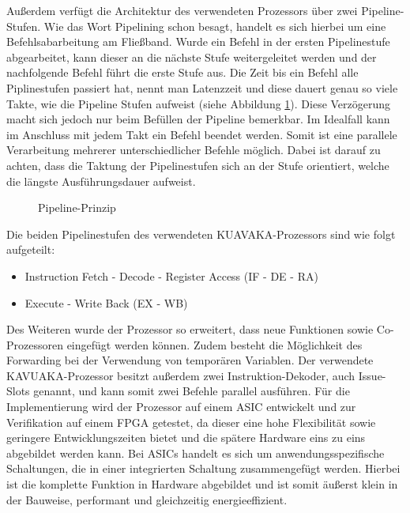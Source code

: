 Außerdem verfügt die Architektur des verwendeten Prozessors über zwei Pipeline-Stufen.
Wie das Wort Pipelining schon besagt, handelt es sich hierbei um eine Befehlsabarbeitung am Fließband. Wurde ein Befehl in der ersten Pipelinestufe abgearbeitet, kann dieser an die nächste Stufe weitergeleitet werden und der nachfolgende Befehl führt die erste Stufe aus. Die Zeit bis ein Befehl alle Piplinestufen passiert hat, nennt man Latenzzeit und diese dauert genau so viele Takte, wie die Pipeline Stufen aufweist (siehe Abbildung \ref{fig:pipeline}). Diese Verzögerung macht sich jedoch nur beim Befüllen der Pipeline bemerkbar. Im Idealfall kann im Anschluss mit jedem Takt ein Befehl beendet werden. Somit ist eine parallele Verarbeitung mehrerer unterschiedlicher Befehle möglich. Dabei ist darauf zu achten, dass die Taktung der Pipelinestufen sich an der Stufe orientiert, welche die längste Ausführungsdauer aufweist. \cite[Seite 204]{wust2010mikroprozessortechnik}
\begin{figure}[H] 
	\centering
	
	\caption{Pipeline-Prinzip}
	\label{fig:pipeline}
\end{figure}
\newpage
Die beiden Pipelinestufen des verwendeten KUAVAKA-Prozessors sind wie folgt aufgeteilt:
\begin{itemize}
	\item[1.] Instruction Fetch - Decode - Register Access (IF - DE - RA) 
	\item[2.] Execute - Write Back (EX - WB)
\end{itemize}

Des Weiteren wurde der Prozessor so erweitert, dass neue Funktionen sowie Co-Prozessoren eingefügt werden können. Zudem besteht die Möglichkeit des Forwarding bei der Verwendung von temporären Variablen.
Der verwendete KAVUAKA-Prozessor besitzt außerdem zwei Instruktion-Dekoder, auch Issue-Slots genannt, und kann somit zwei Befehle parallel ausführen.
Für die Implementierung wird der Prozessor auf einem ASIC entwickelt und zur Verifikation auf einem FPGA getestet, da dieser eine hohe Flexibilität sowie geringere Entwicklungszeiten bietet und die spätere Hardware eins zu eins abgebildet werden kann.\cite{lukasglitches2017}
Bei ASICs handelt es sich um anwendungsspezifische Schaltungen, die in einer integrierten Schaltung zusammengefügt werden. Hierbei ist die komplette Funktion in Hardware abgebildet und ist somit äußerst klein in der Bauweise, performant und gleichzeitig energieeffizient.


\newpage


